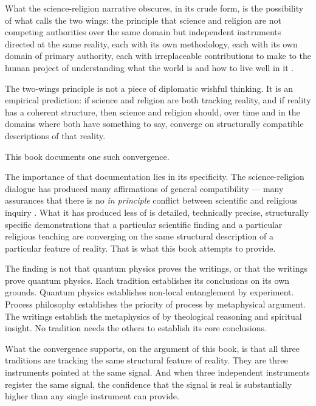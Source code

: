 What the science-religion narrative obscures, in its crude form, is the
possibility of what \citet{ParisTalks} calls the two wings: the principle that
science and religion are not competing authorities over the same domain but
independent instruments directed at the same reality, each with its own
methodology, each with its own domain of primary authority, each with
irreplaceable contributions to make to the human project of understanding what
the world is and how to live well in it \citep{PUP}.

The two-wings principle is not a piece of diplomatic wishful thinking.  It is an
empirical prediction: if science and religion are both tracking reality, and if
reality has a coherent structure, then science and religion should, over time and
in the domains where both have something to say, converge on structurally
compatible descriptions of that reality.

This book documents one such convergence.

The importance of that documentation lies in its specificity.  The science-religion
dialogue has produced many affirmations of general compatibility --- many assurances
that there is no \emph{in principle} conflict between scientific and religious
inquiry \citep{Barbour2000,Peacocke1993,Polkinghorne1998}.  What it has produced
less of is detailed, technically precise, structurally specific demonstrations
that a particular scientific finding and a particular religious teaching are
converging on the same structural description of a particular feature of reality.
That is what this book attempts to provide.

The finding is not that quantum physics proves the \bahai writings, or that the
\bahai writings prove quantum physics.  Each tradition establishes its conclusions
on its own grounds.  Quantum physics establishes non-local entanglement by
experiment.  Process philosophy establishes the priority of process by
metaphysical argument.  The \bahai writings establish the metaphysics of
\mahabbat by theological reasoning and spiritual insight.  No tradition needs the
others to establish its core conclusions.

What the convergence supports, on the argument of this book, is that all three
traditions are tracking the same structural feature of reality.  They are three instruments pointed at the
same signal.  And when three independent instruments register the same signal,
the confidence that the signal is real is substantially higher than any single
instrument can provide.

